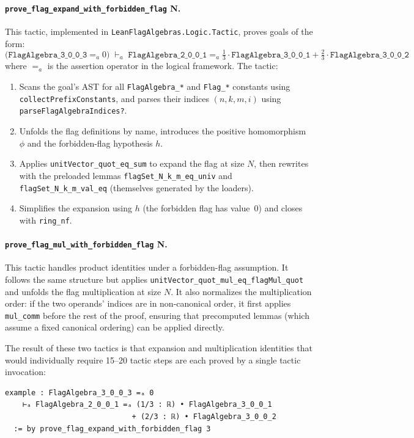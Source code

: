 \documentclass{article}
\newcommand{\lean}[1]{\texttt{#1}}
\begin{document}
\paragraph{\lean{prove\_flag\_expand\_with\_forbidden\_flag} N.}
This tactic, implemented in \lean{LeanFlagAlgebras.Logic.Tactic}, proves goals
of the form:
\[
  \bigl(\lean{FlagAlgebra\_3\_0\_0\_3} =_{a} 0\bigr)
  \;\vdash_a\;
  \lean{FlagAlgebra\_2\_0\_0\_1} =_{a} \tfrac{1}{3} \cdot \lean{FlagAlgebra\_3\_0\_0\_1}
    + \tfrac{2}{3} \cdot \lean{FlagAlgebra\_3\_0\_0\_2}
\]
where $=_{a}$ is the assertion operator in the logical framework.  The tactic:
\begin{enumerate}
  \item Scans the goal's AST for all \lean{FlagAlgebra\_*} and \lean{Flag\_*}
    constants using \lean{collectPrefixConstants}, and parses their indices
    $(n, k, m, i)$ using \lean{parseFlagAlgebraIndices?}.
  \item Unfolds the flag definitions by name, introduces the positive
    homomorphism $\phi$ and the forbidden-flag hypothesis $h$.
  \item Applies \lean{unitVector\_quot\_eq\_sum} to expand the flag at size
    $N$, then rewrites with the preloaded lemmas \lean{flagSet\_N\_k\_m\_eq\_univ}
    and \lean{flagSet\_N\_k\_m\_val\_eq} (themselves generated by the loaders).
  \item Simplifies the expansion using $h$ (the forbidden flag has value~0)
    and closes with \lean{ring\_nf}.
\end{enumerate}

\paragraph{\lean{prove\_flag\_mul\_with\_forbidden\_flag} N.}
This tactic handles product identities under a forbidden-flag assumption.  It
follows the same structure but applies \lean{unitVector\_quot\_mul\_eq\_flagMul\_quot}
and unfolds the flag multiplication at size $N$.  It also normalizes the
multiplication order: if the two operands' indices are in non-canonical order,
it first applies \lean{mul\_comm} before the rest of the proof, ensuring that
precomputed lemmas (which assume a fixed canonical ordering) can be applied
directly.

The result of these two tactics is that expansion and multiplication identities
that would individually require 15--20 tactic steps are each proved by a single
tactic invocation:
\begin{lstlisting}
example : FlagAlgebra_3_0_0_3 =ₐ 0
    ⊢ₐ FlagAlgebra_2_0_0_1 =ₐ (1/3 : ℝ) • FlagAlgebra_3_0_0_1
                             + (2/3 : ℝ) • FlagAlgebra_3_0_0_2
  := by prove_flag_expand_with_forbidden_flag 3
\end{lstlisting}
\end{document}
